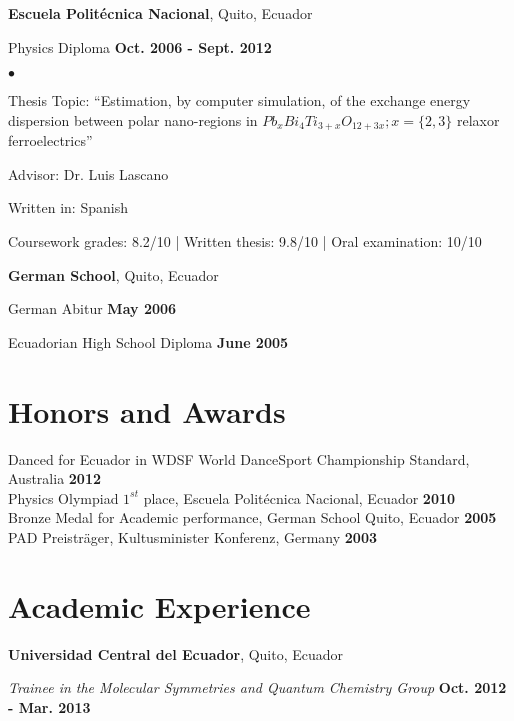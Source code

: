 \documentclass[margin,line]{res}
\newenvironment{list1}{
  \begin{list}{\ding{113}}{%
      \setlength{\itemsep}{0in}
      \setlength{\parsep}{0in} \setlength{\parskip}{0in}
      \setlength{\topsep}{0in} \setlength{\partopsep}{0in} 
      \setlength{\leftmargin}{0.17in}}}{\end{list}}
\newenvironment{list2}{
  \begin{list}{$\bullet$}{%
      \setlength{\itemsep}{0in}
      \setlength{\parsep}{0in} \setlength{\parskip}{0in}
      \setlength{\topsep}{0in} \setlength{\partopsep}{0in} 
      \setlength{\leftmargin}{0.2in}}}{\end{list}}
\begin{document}
\begin{resume}
  {\bf Escuela Politécnica Nacional}, Quito, Ecuador\\
  \vspace{-.1in}
  \begin{list1}
    \item[] Physics Diploma \hfill {\bf Oct. 2006 - Sept. 2012}\\
    \begin{list2}
    \vspace{-.1in}
      \item Thesis Topic:  ``Estimation, by computer simulation, of the exchange
	energy dispersion between polar nano-regions in $Pb_xBi_4Ti_{3+x}O_{12+3x}; x=\{2,3\}$
	relaxor ferroelectrics''
      \item Advisor: Dr. Luis Lascano
      \item Written in: Spanish
      \item Coursework grades: 8.2/10 | Written thesis: 9.8/10 | Oral examination: 10/10
    \end{list2}
  \end{list1}

  {\bf German School}, Quito, Ecuador\\
  \vspace{-.1in}
  \begin{list1}
    \item[] German Abitur \hfill {\bf May 2006}
    \item[] Ecuadorian High School Diploma \hfill {\bf June 2005}
  \end{list1}

\section{\sc Honors and Awards}
  Danced for Ecuador in WDSF World DanceSport Championship Standard, Australia \hfill {\bf 2012}\\
  Physics Olympiad $1^{st}$ place, Escuela Politécnica Nacional, Ecuador \hfill {\bf 2010}\\
  Bronze Medal for Academic performance, German School Quito, Ecuador \hfill {\bf 2005}\\
  PAD Preisträger, Kultusminister Konferenz, Germany \hfill {\bf 2003}

\section{\sc Academic Experience}
  {\bf Universidad Central del Ecuador}, Quito, Ecuador
  \begin{list1}
    \item[] {\em Trainee in the Molecular Symmetries and Quantum Chemistry Group} \hfill {\bf Oct. 2012 - Mar. 2013}
  \end{list1}


\end{resume}
\end{document}
